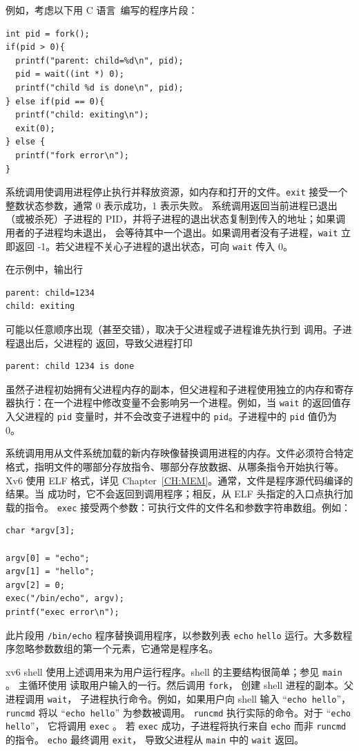 例如，考虑以下用 C 语言~\cite{kernighan}编写的程序片段：
\begin{lstlisting}[]
int pid = fork();
if(pid > 0){
  printf("parent: child=%d\n", pid);
  pid = wait((int *) 0);
  printf("child %d is done\n", pid);
} else if(pid == 0){
  printf("child: exiting\n");
  exit(0);
} else {
  printf("fork error\n");
}
\end{lstlisting}
系统调用使调用进程停止执行并释放资源，如内存和打开的文件。\lstinline{exit} 接受一个整数状态参数，通常 0 表示成功，1 表示失败。
系统调用返回当前进程已退出（或被杀死）子进程的 PID，并将子进程的退出状态复制到传入的地址；如果调用者的子进程均未退出，
会等待其中一个退出。如果调用者没有子进程，\lstinline{wait} 立即返回 -1。若父进程不关心子进程的退出状态，可向
\lstinline{wait}
传入 0。

在示例中，输出行
\begin{lstlisting}[]
parent: child=1234
child: exiting
\end{lstlisting}
可能以任意顺序出现（甚至交错），取决于父进程或子进程谁先执行到
调用。子进程退出后，父进程的
返回，导致父进程打印
\begin{lstlisting}[]
parent: child 1234 is done
\end{lstlisting}
虽然子进程初始拥有父进程内存的副本，但父进程和子进程使用独立的内存和寄存器执行：在一个进程中修改变量不会影响另一个进程。例如，当
\lstinline{wait}
的返回值存入父进程的
\lstinline{pid}
变量时，并不会改变子进程中的
\lstinline{pid}。子进程中的
\lstinline{pid}
值仍为 0。

系统调用用从文件系统加载的新内存映像替换调用进程的内存。文件必须符合特定格式，指明文件的哪部分存放指令、哪部分存放数据、从哪条指令开始执行等。Xv6 使用 ELF 格式，详见 Chapter~\ref{CH:MEM}。通常，文件是程序源代码编译的结果。当
成功时，它不会返回到调用程序；相反，从 ELF 头指定的入口点执行加载的指令。
\lstinline{exec}
接受两个参数：可执行文件的文件名和参数字符串数组。例如：
\begin{lstlisting}[]
char *argv[3];

argv[0] = "echo";
argv[1] = "hello";
argv[2] = 0;
exec("/bin/echo", argv);
printf("exec error\n");
\end{lstlisting}
此片段用
\lstinline{/bin/echo}
程序替换调用程序，以参数列表
\lstinline{echo}
\lstinline{hello}
运行。大多数程序忽略参数数组的第一个元素，它通常是程序名。

xv6 shell 使用上述调用来为用户运行程序。shell 的主要结构很简单；参见
\lstinline{main}
。
主循环使用
读取用户输入的一行。然后调用
\lstinline{fork}，
创建 shell 进程的副本。父进程调用
\lstinline{wait}，
子进程执行命令。例如，如果用户向 shell 输入
``\lstinline{echo hello}''，
\lstinline{runcmd}
将以
``\lstinline{echo hello}''
为参数被调用。
\lstinline{runcmd}
执行实际的命令。对于
``\lstinline{echo hello}''，
它将调用
\lstinline{exec}
。
若
\lstinline{exec}
成功，子进程将执行来自
\lstinline{echo}
而非
\lstinline{runcmd}
的指令。
\lstinline{echo}
最终调用
\lstinline{exit}，
导致父进程从
\lstinline{main}
中的
\lstinline{wait}
返回。

